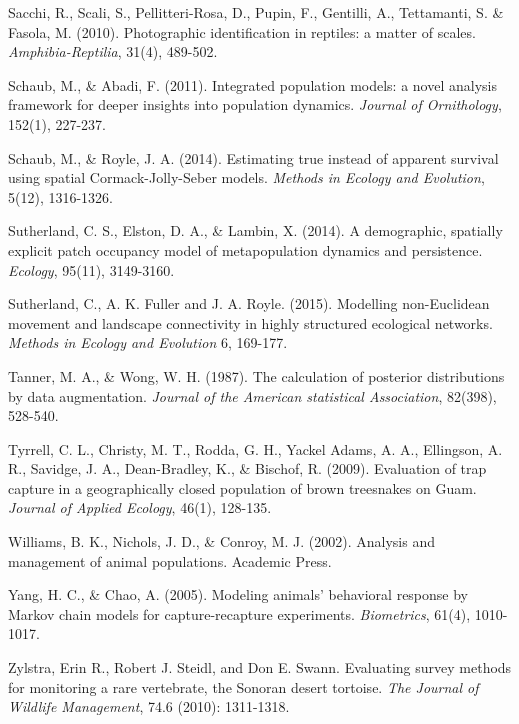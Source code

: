 \documentclass{book}
\begin{document}
\rf Sacchi, R., Scali, S., Pellitteri-Rosa, D., Pupin, F., Gentilli, A., Tettamanti, S. \& Fasola, M. (2010). Photographic identification in reptiles: a matter of scales. \textit{Amphibia-Reptilia}, 31(4), 489-502.

\rf Schaub, M., \& Abadi, F. (2011). Integrated population models: a novel analysis framework for deeper insights into population dynamics. \textit{Journal of Ornithology}, 152(1), 227-237.

\rf Schaub, M., \& Royle, J. A. (2014). Estimating true instead of apparent survival using spatial Cormack-Jolly-Seber models. \textit{Methods in Ecology and Evolution}, 5(12), 1316-1326.

\rf Sutherland, C. S., Elston, D. A., \& Lambin, X. (2014). A demographic, spatially explicit patch occupancy model of metapopulation dynamics and persistence. \textit{Ecology}, 95(11), 3149-3160.

\rf Sutherland, C., A. K. Fuller and J. A. Royle. (2015). Modelling non-Euclidean movement and landscape connectivity in highly structured ecological networks. {\it Methods in Ecology and Evolution}  6, 169-177.

\rf Tanner, M. A., \& Wong, W. H. (1987). The calculation of posterior distributions by data augmentation. \textit{Journal of the American statistical Association}, 82(398), 528-540.

\rf Tyrrell, C. L., Christy, M. T., Rodda, G. H., Yackel Adams, A. A., Ellingson, A. R., Savidge, J. A., Dean-Bradley, K., \& Bischof, R. (2009). Evaluation of trap capture in a geographically closed population of brown treesnakes on Guam. \textit{Journal of Applied Ecology}, 46(1), 128-135.

\rf Williams, B. K., Nichols, J. D., \& Conroy, M. J. (2002). Analysis and management of animal populations. Academic Press.

\rf Yang, H. C., \& Chao, A. (2005). Modeling animals' behavioral response by Markov chain models for capture-recapture experiments. \textit{Biometrics}, 61(4), 1010-1017.

\rf Zylstra, Erin R., Robert J. Steidl, and Don E. Swann. Evaluating survey methods for monitoring a rare vertebrate, the Sonoran desert tortoise. \textit{The Journal of Wildlife Management}, 74.6 (2010): 1311-1318.
\end{document}
